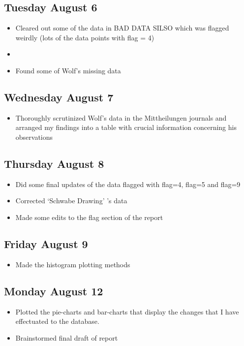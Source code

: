 \documentclass[12pt]{article}
\begin{document}
\subsection{Tuesday August 6}
\begin{itemize}
    \item Cleared out some of the data in BAD DATA SILSO which was flagged weirdly (lots of the data points with flag = 4)
    \item 
    \item Found some of Wolf's missing data
\end{itemize}

\subsection{Wednesday August 7}
\begin{itemize}
    \item Thoroughly scrutinized Wolf's data in the Mittheilungen journals and arranged my findings into a table with crucial information concerning his observations
\end{itemize}

\subsection{Thursday August 8}
\begin{itemize}
    \item Did some final updates of the data flagged with flag=4, flag=5 and flag=9
    \item Corrected `Schwabe Drawing' 's data
    \item Made some edits to the flag section of the report
\end{itemize}

\subsection{Friday August 9}
\begin{itemize}
    \item Made the histogram plotting methods
\end{itemize}

\subsection{Monday August 12}
\begin{itemize}
    \item Plotted the pie-charts and bar-charts that display the changes that I have effectuated to the database.
    \item Brainstormed final draft of report
\end{itemize}
\end{document}
